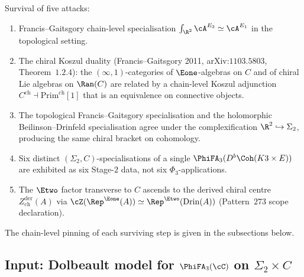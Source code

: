 Survival of five attacks:
\begin{enumerate}
\item[(S1)] Francis--Gaitsgory chain-level specialisation $\int_{\R^2}\cA^{E_3}\simeq \cA^{E_1}$ in the topological setting.
\item[(S2)] The chiral Koszul duality (Francis--Gaitsgory 2011, arXiv:$1103.5803$, Theorem~$1.2.4$): the $(\infty,1)$-categories of $\Eone$-algebras on $C$ and of chiral Lie algebras on $\Ran(C)$ are related by a chain-level Koszul adjunction $C^{\mathrm{ch}}\dashv\mathrm{Prim}^{\mathrm{ch}}[1]$ that is an equivalence on connective objects.
\item[(S3)] The topological Francis--Gaitsgory specialisation and the holomorphic Beilinson--Drinfeld specialisation agree under the complexification $\R^2\hookrightarrow \Sigma_2$, producing the same chiral bracket on cohomology.
\item[(S4)] Six distinct $(\Sigma_2,C)$-specialisations of a single $\PhiFA_3(D^b\Coh(K3\times E))$ are exhibited as six Stage-$2$ data, not six $\Phi_3$-applications.
\item[(S5)] The $\Etwo$ factor transverse to $C$ ascends to the derived chiral centre $Z^{\mathrm{der}}_{\mathrm{ch}}(A)$ via $\cZ(\Rep^{\Eone}(A))\simeq\Rep^{\Etwo}(\mathrm{Drin}(A))$ (Pattern~$273$ scope declaration).
\end{enumerate}

The chain-level pinning of each surviving step is given in the subsections below.

\subsection{Input: Dolbeault model for \texorpdfstring{$\PhiFA_3(\cC)$}{PhiFA-3(C)} on \texorpdfstring{$\Sigma_2\times C$}{Sigma-2 x C}}
\label{wn:subsec:agent3-dolbeault-input}


